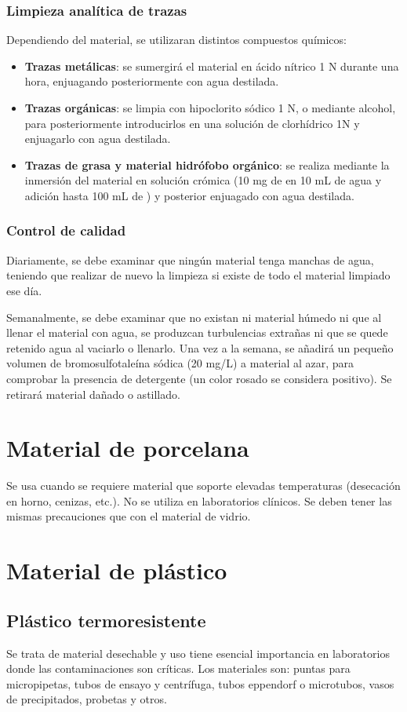 \subsubsection{Limpieza analítica de trazas}
Dependiendo del material, se utilizaran distintos compuestos químicos:
\begin{itemize}[itemsep=0pt,parsep=0pt,topsep=0pt,partopsep=0pt]
    \item \textbf{Trazas metálicas}: se sumergirá el material en ácido nítrico 1 N durante una hora, enjuagando posteriormente con agua destilada.
    \item\textbf{Trazas orgánicas}: se limpia con hipoclorito sódico 1 N, o mediante alcohol, para posteriormente introducirlos en una solución de clorhídrico 1N y enjuagarlo con agua destilada.
    \item\textbf{Trazas de grasa y material hidrófobo orgánico}: se realiza mediante la inmersión del material en solución crómica (10 mg de  en 10 mL de agua y adición hasta 100 mL de ) y posterior enjuagado con agua destilada.
\end{itemize}
\subsubsection{Control de calidad}
Diariamente, se debe examinar que ningún material tenga manchas de agua, teniendo que realizar de nuevo la limpieza si existe de todo el material limpiado ese día.

Semanalmente, se debe examinar que no existan ni material húmedo ni que al llenar el material con agua, se produzcan turbulencias extrañas ni que se quede retenido agua al vaciarlo o llenarlo. Una vez a la semana, se añadirá un pequeño volumen de bromosulfotaleína sódica (20 mg/L) a material al azar, para comprobar la presencia de detergente (un color rosado se considera positivo). Se retirará material dañado o astillado.
\section{Material de porcelana}
Se usa cuando se requiere material que soporte elevadas temperaturas (desecación en horno, cenizas, etc.). No se utiliza en laboratorios clínicos. Se deben tener las mismas precauciones que con el material de vidrio.
\section{Material de plástico}
\subsection{Plástico termoresistente}
Se trata de material desechable y uso tiene esencial importancia en laboratorios donde las contaminaciones son críticas. Los materiales son: puntas para micropipetas, tubos de ensayo y centrífuga, tubos eppendorf o microtubos, vasos de precipitados, probetas y otros.

